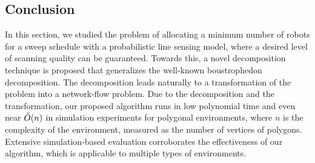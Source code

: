 \subsection{Conclusion }%

In this section, we studied the problem of allocating a minimum number of robots for a sweep schedule with a probabilistic line sensing model, where a desired level of scanning quality can be guaranteed. 
Towards this, a novel decomposition technique is proposed that generalizes the well-known boustrophedon decomposition. The decomposition leads naturally to a transformation of the problem into a network-flow problem. Due to the decomposition and the transformation, our proposed algorithm runs in low polynomial time and even near $\Tilde{O}(n)$ in simulation experiments for polygonal environments, where $n$ is the complexity of the environment, measured as the number of vertices of polygons. Extensive simulation-based evaluation corroborates the effectiveness of our algorithm, which is applicable to multiple types of environments.  


